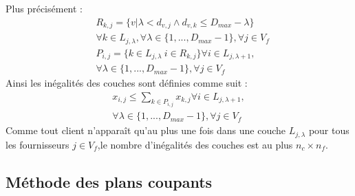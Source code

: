 \documentclass[12pt,a4paper]{article}
\begin{document}
\begin{multicols}{2}
Plus précisément :
\begin{align*}
&R_{k,j} = \{ v | \lambda < d_{v,j} \wedge d_{v,k}\leq D_{max}-\lambda \} \\ 
&\forall k \in L_{j,\lambda}, \forall \lambda \in \{ 1,...,D_{max}-1 \}, \forall j \in V_{f}\\
&P_{i,j} = \{ k \in L_{j,\lambda} \ i \in R_{k,j} \} \forall i \in L_{j,\lambda +1}, \\ 
&  \forall \lambda \in \{ 1,...,D_{max}-1 \}, \forall j \in V_{f}
\end{align*}
Ainsi les inégalités des couches sont définies comme suit : 
\begin{equation}\label{eq:layers}
\begin{aligned}
x_{i,j} \leq \sum_{k\in P_{i,j}}{x_{k,j}} \forall i \in L_{j,\lambda +1}, \\ \forall \lambda \in \{ 1,...,D_{max}-1 \}, \forall j \in V_{f}
\end{aligned}
\end{equation}
Comme tout client n'apparaît qu'au plus une fois dans une couche $L_{j,\lambda}$ pour tous les fournisseurs $j \in V_{f}$,le nombre d'inégalités des couches est au plus $n_{c}\times n_{f}$.
\subsection{Méthode des plans coupants}

\end{multicols}
\end{document}
